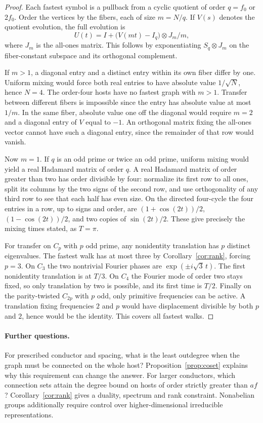 \documentclass[11pt]{article}
\begin{document}
\begin{proof}
Each fastest symbol is a pullback from a cyclic quotient of order $q=f_0$ or $2f_0$. Order the vertices by the fibers, each of size $m=N/q$. If $V(s)$ denotes the quotient evolution, the full evolution is
\[
 U(t)=I+\bigl(V(mt)-I_q\bigr)\otimes J_m/m,
\]
where $J_m$ is the all-ones matrix. This follows by exponentiating $S_q\otimes J_m$ on the fiber-constant subspace and its orthogonal complement.

If $m>1$, a diagonal entry and a distinct entry within its own fiber differ by one. Uniform mixing would force both real entries to have absolute value $1/\sqrt N$, hence $N=4$. The order-four hosts have no fastest graph with $m>1$. Transfer between different fibers is impossible since the entry has absolute value at most $1/m$. In the same fiber, absolute value one off the diagonal would require $m=2$ and a diagonal entry of $V$ equal to $-1$. An orthogonal matrix fixing the all-ones vector cannot have such a diagonal entry, since the remainder of that row would vanish.

Now $m=1$. If $q$ is an odd prime or twice an odd prime, uniform mixing would yield a real Hadamard matrix of order $q$. A real Hadamard matrix of order greater than two has order divisible by four: normalize its first row to all ones, split its columns by the two signs of the second row, and use orthogonality of any third row to see that each half has even size. On the directed four-cycle the four entries in a row, up to signs and order, are $(1+\cos(2t))/2$, $(1-\cos(2t))/2$, and two copies of $\sin(2t)/2$. These give precisely the mixing times stated, as $T=\pi$.

For transfer on $C_p$ with $p$ odd prime, any nonidentity translation has $p$ distinct eigenvalues. The fastest walk has at most three by Corollary~\ref{cor:rank}, forcing $p=3$. On $C_3$ the two nontrivial Fourier phases are $\exp(\pm i\sqrt3\,t)$. The first nonidentity translation is at $T/3$. On $C_4$ the Fourier mode of order two stays fixed, so only translation by two is possible, and its first time is $T/2$. Finally on the parity-twisted $C_{2p}$ with $p$ odd, only primitive frequencies can be active. A translation fixing frequencies $2$ and $p$ would have displacement divisible by both $p$ and $2$, hence would be the identity. This covers all fastest walks.
\end{proof}

\paragraph{Further questions.} For prescribed conductor and spacing, what is the least outdegree when the graph must be connected on the whole host? Proposition~\ref{prop:coset} explains why this requirement can change the answer. For larger conductors, which connection sets attain the degree bound on hosts of order strictly greater than $af$? Corollary~\ref{cor:rank} gives a duality, spectrum and rank constraint. Nonabelian groups additionally require control over higher-dimensional irreducible representations.
\end{document}
